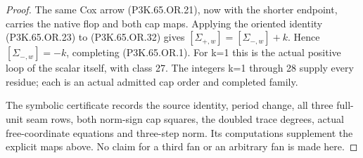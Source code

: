 \begin{proof}
The same Cox arrow (P3K.65.OR.21), now with the shorter endpoint,
carries the native flop and both cap maps. Applying the oriented
identity (P3K.65.OR.23) to (P3K.65.OR.32) gives
\([\Sigma_{+,w}]=[\Sigma_{-,w}]+k\). Hence
\([\Sigma_{-,w}]=-k\), completing (P3K.65.OR.1). For k=1 this is
the actual positive loop of the scalar itself, with class 27.
The integers k=1 through 28 supply every residue; each is an
actual admitted cap order and completed family.

The symbolic certificate records the source identity, period
change, all three full-unit seam rows, both norm-sign cap squares,
the doubled trace degrees, actual free-coordinate equations and
three-step norm. Its computations supplement the explicit maps
above. No claim for a third fan or an arbitrary fan is made here.
\end{proof}
